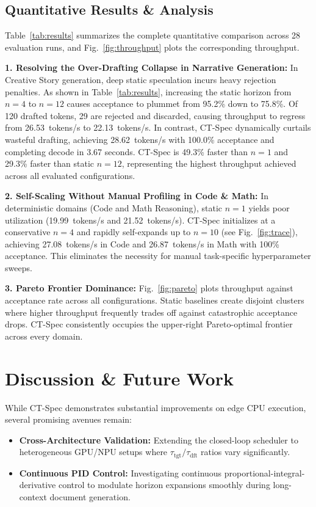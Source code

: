 \documentclass[journal,10pt,twocolumn]{IEEEtran}
\newcommand{\ttg}{\mathrm{tgt}}
\newcommand{\dft}{\mathrm{dft}}
\newcommand{\ctspec}{\mbox{CT-Spec}}
\begin{document}
\subsection{Quantitative Results \& Analysis}
Table~\ref{tab:results} summarizes the complete quantitative comparison across 28 evaluation runs, and Fig.~\ref{fig:throughput} plots the corresponding throughput.

\textbf{1. Resolving the Over-Drafting Collapse in Narrative Generation:}
In Creative Story generation, deep static speculation incurs heavy rejection penalties. As shown in Table~\ref{tab:results}, increasing the static horizon from $n=4$ to $n=12$ causes acceptance to plummet from 95.2\% down to 75.8\%. Of 120 drafted tokens, 29 are rejected and discarded, causing throughput to regress from 26.53~tokens/s to 22.13~tokens/s.
In contrast, \ctspec{} dynamically curtails wasteful drafting, achieving 28.62~tokens/s with 100.0\% acceptance and completing decode in 3.67 seconds. \ctspec{} is 49.3\% faster than $n=1$ and 29.3\% faster than static $n=12$, representing the highest throughput achieved across all evaluated configurations.

\textbf{2. Self-Scaling Without Manual Profiling in Code \& Math:}
In deterministic domains (Code and Math Reasoning), static $n=1$ yields poor utilization (19.99~tokens/s and 21.52~tokens/s). \ctspec{} initializes at a conservative $n=4$ and rapidly self-expands up to $n=10$ (see Fig.~\ref{fig:trace}), achieving 27.08~tokens/s in Code and 26.87~tokens/s in Math with 100\% acceptance. This eliminates the necessity for manual task-specific hyperparameter sweeps.

\textbf{3. Pareto Frontier Dominance:}
Fig.~\ref{fig:pareto} plots throughput against acceptance rate across all configurations. Static baselines create disjoint clusters where higher throughput frequently trades off against catastrophic acceptance drops. \ctspec{} consistently occupies the upper-right Pareto-optimal frontier across every domain.

\section{Discussion \& Future Work}
While \ctspec{} demonstrates substantial improvements on edge CPU execution, several promising avenues remain:
\begin{itemize}
    \item \textbf{Cross-Architecture Validation:} Extending the closed-loop scheduler to heterogeneous GPU/NPU setups where $\tau_{\ttg} / \tau_{\dft}$ ratios vary significantly.
    \item \textbf{Continuous PID Control:} Investigating continuous proportional-integral-derivative control to modulate horizon expansions smoothly during long-context document generation.
\end{itemize}
\end{document}
